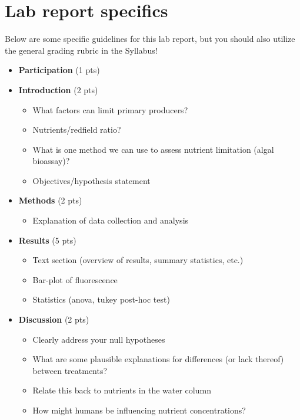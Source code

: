 \documentclass[11pt,]{article}
\providecommand{\tightlist}{%
\setlength{\itemsep}{0pt}\setlength{\parskip}{0pt}}
\begin{document}
\pagebreak

\section{Lab report specifics}\label{lab-report-specifics}

Below are some specific guidelines for this lab report, but you should
also utilize the general grading rubric in the Syllabus!

\begin{itemize}
\item
  \textbf{Participation} (1 pts)
\item
  \textbf{Introduction} (2 pts)

  \begin{itemize}
  \tightlist
  \item
    What factors can limit primary producers?
  \item
    Nutrients/redfield ratio?
  \item
    What is one method we can use to assess nutrient limitation (algal
    bioassay)?
  \item
    Objectives/hypothesis statement
  \end{itemize}
\item
  \textbf{Methods} (2 pts)

  \begin{itemize}
  \tightlist
  \item
    Explanation of data collection and analysis
  \end{itemize}
\item
  \textbf{Results} (5 pts)

  \begin{itemize}
  \tightlist
  \item
    Text section (overview of results, summary statistics, etc.)
  \item
    Bar-plot of fluorescence
  \item
    Statistics (anova, tukey post-hoc test)
  \end{itemize}
\item
  \textbf{Discussion} (2 pts)

  \begin{itemize}
  \tightlist
  \item
    Clearly address your null hypotheses
  \item
    What are some plausible explanations for differences (or lack
    thereof) between treatments?
  \item
    Relate this back to nutrients in the water column
  \item
    How might humans be influencing nutrient concentrations?
  \end{itemize}
\end{itemize}




\newpage
\singlespacing 
\end{document}
